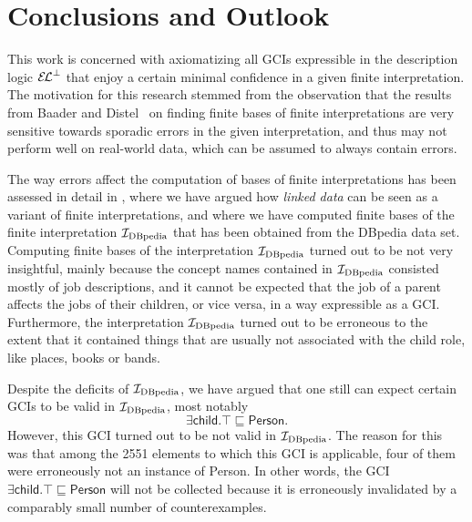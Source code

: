 \chapter{Conclusions and Outlook}
\label{cha:conclusions}

This work is concerned with axiomatizing all GCIs expressible in the description logic
${{\mathcal{E}\kern-.3ex\mathcal{L}}^\bot}$ that enjoy a certain minimal confidence in a given finite interpretation.  The
motivation for this research stemmed from the observation that the results from Baader and
Distel~\cite{Diss-Felix} on finding finite bases of finite interpretations are very
sensitive towards sporadic errors in the given interpretation, and thus may not perform
well on real-world data, which can be assumed to always contain errors.

The way errors affect the computation of bases of finite interpretations has been assessed
in detail in , where we have argued how \emph{linked data}
can be seen as a variant of finite interpretations, and where we have computed finite
bases of the finite interpretation ${\mathcal{I}_{\text{DBpedia}}}$ that has been obtained from the DBpedia
data set.  Computing finite bases of the interpretation ${\mathcal{I}_{\text{DBpedia}}}$ turned out to be not
very insightful, mainly because the concept names contained in ${\mathcal{I}_{\text{DBpedia}}}$ consisted
mostly of job descriptions, and it cannot be expected that the job of a parent affects the
jobs of their children, or vice versa, in a way expressible as a GCI.  Furthermore, the
interpretation ${\mathcal{I}_{\text{DBpedia}}}$ turned out to be erroneous to the extent that it contained
things that are usually not associated with the \textsf{child} role, like places, books or
bands.

Despite the deficits of ${\mathcal{I}_{\text{DBpedia}}}$, we have argued that one still can expect certain GCIs
to be valid in ${\mathcal{I}_{\text{DBpedia}}}$, most notably
\begin{equation*}
  \exists \mathsf{child}. \top \sqsubseteq \mathsf{Person}.
\end{equation*}
However, this GCI turned out to be not valid in ${\mathcal{I}_{\text{DBpedia}}}$.  The reason for this was that
among the 2551 elements to which this GCI is applicable, four of them were erroneously not
an instance of \textsf{Person}.  In other words, the GCI $\exists \mathsf{child}. \top
\sqsubseteq \mathsf{Person}$ will not be collected because it is erroneously invalidated
by a comparably small number of counterexamples.

